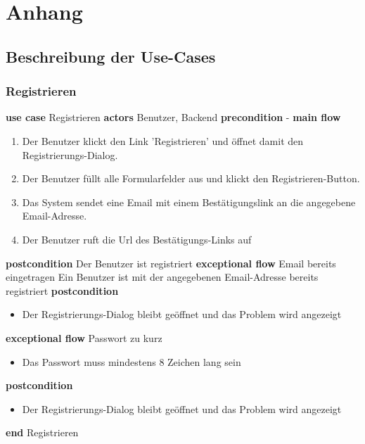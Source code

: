 \section{Anhang}

\subsection{Beschreibung der Use-Cases}

\subsubsection{Registrieren}\label{subsubsec:uc_reg}
\noindent \textbf{use case} Registrieren \newline
\indent \textbf{actors} \newline
\indent \indent Benutzer, Backend \newline
\indent \textbf{precondition} \newline
\indent \indent - \newline
\indent \textbf{main flow}
\begin{enumerate}[labelwidth=0pt,leftmargin=39pt,noitemsep,topsep=0pt,parsep=0pt,partopsep=0pt]
\item Der Benutzer klickt den Link 'Registrieren' und öffnet damit den Registrierungs-Dialog.
\item Der Benutzer füllt alle Formularfelder aus und klickt den Registrieren-Button.
\item Das System sendet eine Email mit einem Bestätigungslink an die angegebene Email-Adresse.
\item Der Benutzer ruft die Url des Bestätigungs-Links auf
\end{enumerate}
\indent \indent \textbf{postcondition} \newline
\indent \indent Der Benutzer ist registriert \newline
\indent \textbf{exceptional flow} Email bereits eingetragen \newline
\indent \indent Ein Benutzer ist mit der angegebenen Email-Adresse bereits registriert \newline
\indent \textbf{postcondition}
\begin{itemize}[label={},labelwidth=0pt,leftmargin=24pt,noitemsep,topsep=0pt,parsep=0pt,partopsep=0pt]
\item Der Registrierungs-Dialog bleibt geöffnet und das Problem wird angezeigt
\end{itemize}
\indent \indent \textbf{exceptional flow} Passwort zu kurz
\begin{itemize}[label={},labelwidth=0pt,leftmargin=24pt,noitemsep,topsep=0pt,parsep=0pt,partopsep=0pt]
\item Das Passwort muss mindestens 8 Zeichen lang sein
\end{itemize}
\indent \indent \textbf{postcondition}
\begin{itemize}[label={},labelwidth=0pt,leftmargin=24pt,noitemsep,topsep=0pt,parsep=0pt,partopsep=0pt]
\item Der Registrierungs-Dialog bleibt geöffnet und das Problem wird angezeigt
\end{itemize}
\noindent \textbf{end} Registrieren \newline

